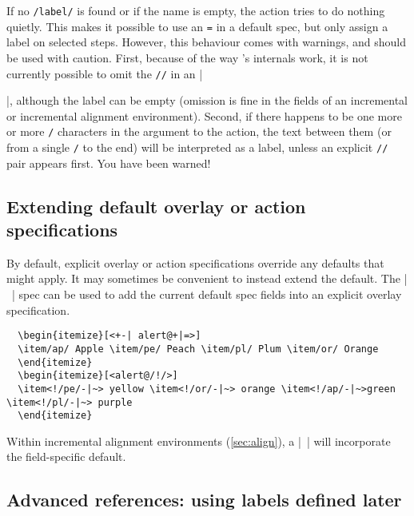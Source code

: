 \documentclass[a4paper]{ltxdoc}
\begin{document}
If no \texttt{/label/} is found or if the name is empty, the action tries to do
nothing quietly.  This makes it possible to use an \texttt{=} in a default spec,
but only assign a label on selected steps.  However, this behaviour comes with
warnings, and should be used with caution.  First, because of the way \beamer's
internals work, it is not currently possible to omit the \texttt{//} in an
|\item|, although the label can be empty (omission is fine in the fields of an
incremental or incremental alignment environment).  Second, if there happens to
be one more or more \texttt{/} characters in the argument to the action, the
text between them (or from a single \texttt{/} to the end) will be interpreted
as a label, unless an explicit \texttt{//} pair appears first.  You have been
warned!

\subsection{Extending default overlay or action specifications} \label{sec:actions:~}

By default, explicit overlay or action specifications override any defaults that
might apply.  It may sometimes be convenient to instead extend the default.  The
|~| spec can be used to add the current default spec fields into an explicit
overlay specification.
\example
\begin{verbatim}
  \begin{itemize}[<+-| alert@+|=>]
  \item/ap/ Apple \item/pe/ Peach \item/pl/ Plum \item/or/ Orange
  \end{itemize}
  \begin{itemize}[<alert@/!/>]
  \item<!/pe/-|~> yellow \item<!/or/-|~> orange \item<!/ap/-|~>green \item<!/pl/-|~> purple
  \end{itemize}
\end{verbatim}
Within incremental alignment environments (\cref{sec:align}), a |~| will
incorporate the field-specific default.


\subsection{Advanced references: using labels defined later} \label{sec:actions:advanced}
\end{document}
